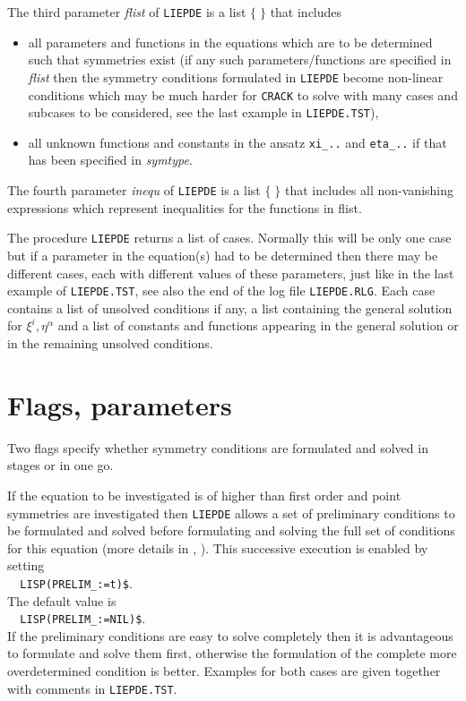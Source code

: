 \documentclass[12pt]{article}
\begin{document}
\noindent The third parameter {\it flist} of {\tt LIEPDE} is a list $\{\;\}$ 
that includes
\begin{itemize}
\item all parameters and functions in the equations which are to
      be determined such that symmetries exist (if any such 
      parameters/functions are 
      specified in {\it flist} then the symmetry conditions 
      formulated in {\tt LIEPDE}
      become non-linear conditions which may be much harder for
      {\tt CRACK} to solve with many cases and subcases to be considered,
      see the last example in {\tt LIEPDE.TST}),
\item all unknown functions and constants in the ansatz 
      \verb+xi_..+ and \verb+eta_..+
      if that has been specified in {\it symtype}.
\end{itemize}
\noindent The fourth parameter {\it inequ} of {\tt LIEPDE} is a list $\{\;\}$ 
that includes all non-vanishing expressions which represent
inequalities for the functions in flist.

The procedure {\tt LIEPDE} returns a list of cases. Normally this will be
only one case but if a parameter in the equation(s) had to be determined
then there may be different cases, each with different values of these
parameters, just like in the last example of {\tt LIEPDE.TST}, see also
the end of the log file {\tt LIEPDE.RLG}. Each case contains a list of 
unsolved conditions if any, a list containing the general solution for 
$\xi^i, \eta^{\alpha}$ and a list of constants and functions appearing 
in the general solution or in the remaining unsolved conditions.

\section{Flags, parameters}
Two flags specify whether symmetry conditions are formulated 
and solved in stages or in one go. 

If the equation to be investigated is of higher than first order 
and point symmetries are investigated then {\tt LIEPDE} allows
a set of preliminary conditions 
to be formulated and solved before formulating and
solving the full set of conditions for this equation (more 
details in \cite{Step},
\cite{Wo}). This successive execution is enabled by setting \\
\verb+  LISP(PRELIM_:=t)$+. \\
The default value is \\ 
\verb+  LISP(PRELIM_:=NIL)$+. \\
If the preliminary conditions are easy to solve completely then 
it is advantageous
to formulate and solve them first, otherwise the formulation of 
the complete more
overdetermined condition is better. Examples for both cases are 
given together with comments in {\tt LIEPDE.TST}.
\end{document}
